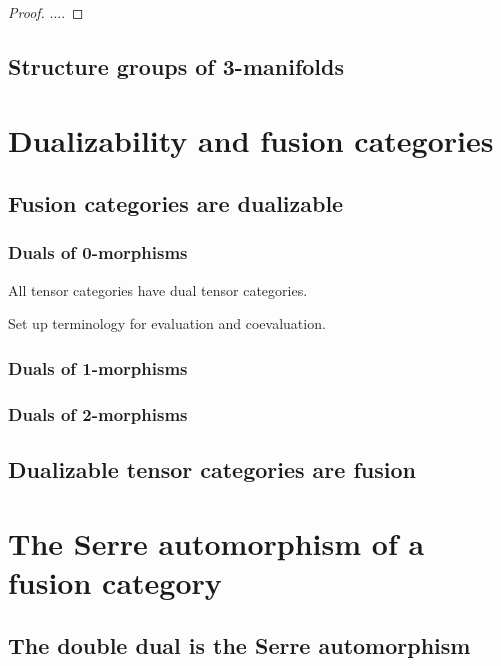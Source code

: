 \documentclass{amsart}
\begin{document}
\begin{proof}
	....
\end{proof}

\subsection{Structure groups of 3-manifolds}



\section{Dualizability and fusion categories}


\subsection{Fusion categories are dualizable}
\subsubsection{Duals of 0-morphisms} All tensor categories have dual tensor categories.

{\color{CSPcolor} Set up terminology for evaluation and coevaluation.}

\subsubsection{Duals of 1-morphisms} 
\subsubsection{Duals of 2-morphisms}
\subsection{Dualizable tensor categories are fusion}



\section{The Serre automorphism of a fusion category}


\subsection{The double dual is the Serre automorphism}
\end{document}
